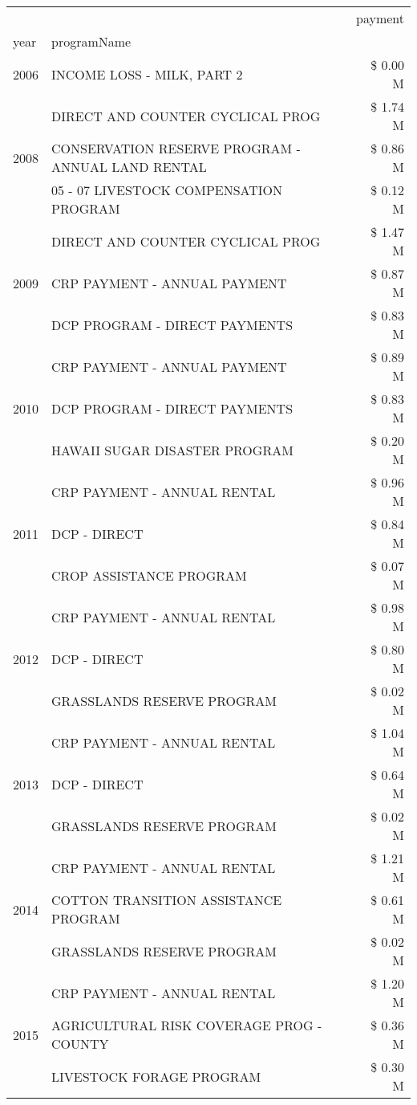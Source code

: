\begin{tabular}{llr}
\toprule
 &  & payment \\
year & programName &  \\
\midrule
2006 & INCOME LOSS - MILK, PART 2 & \$ 0.00 M \\
\cline{1-3}
\multirow[t]{3}{*}{2008} & DIRECT AND COUNTER CYCLICAL PROG & \$ 1.74 M \\
 & CONSERVATION RESERVE PROGRAM - ANNUAL LAND RENTAL & \$ 0.86 M \\
 & 05 - 07 LIVESTOCK COMPENSATION PROGRAM & \$ 0.12 M \\
\cline{1-3}
\multirow[t]{3}{*}{2009} & DIRECT AND COUNTER CYCLICAL PROG & \$ 1.47 M \\
 & CRP PAYMENT - ANNUAL PAYMENT & \$ 0.87 M \\
 & DCP PROGRAM - DIRECT PAYMENTS & \$ 0.83 M \\
\cline{1-3}
\multirow[t]{3}{*}{2010} & CRP PAYMENT - ANNUAL PAYMENT & \$ 0.89 M \\
 & DCP PROGRAM - DIRECT PAYMENTS & \$ 0.83 M \\
 & HAWAII SUGAR DISASTER PROGRAM & \$ 0.20 M \\
\cline{1-3}
\multirow[t]{3}{*}{2011} & CRP PAYMENT - ANNUAL RENTAL & \$ 0.96 M \\
 & DCP - DIRECT & \$ 0.84 M \\
 & CROP ASSISTANCE PROGRAM & \$ 0.07 M \\
\cline{1-3}
\multirow[t]{3}{*}{2012} & CRP PAYMENT - ANNUAL RENTAL & \$ 0.98 M \\
 & DCP - DIRECT & \$ 0.80 M \\
 & GRASSLANDS RESERVE PROGRAM & \$ 0.02 M \\
\cline{1-3}
\multirow[t]{3}{*}{2013} & CRP PAYMENT - ANNUAL RENTAL & \$ 1.04 M \\
 & DCP - DIRECT & \$ 0.64 M \\
 & GRASSLANDS RESERVE PROGRAM & \$ 0.02 M \\
\cline{1-3}
\multirow[t]{3}{*}{2014} & CRP PAYMENT - ANNUAL RENTAL & \$ 1.21 M \\
 & COTTON TRANSITION ASSISTANCE PROGRAM & \$ 0.61 M \\
 & GRASSLANDS RESERVE PROGRAM & \$ 0.02 M \\
\cline{1-3}
\multirow[t]{3}{*}{2015} & CRP PAYMENT - ANNUAL RENTAL & \$ 1.20 M \\
 & AGRICULTURAL RISK COVERAGE PROG - COUNTY & \$ 0.36 M \\
 & LIVESTOCK FORAGE PROGRAM & \$ 0.30 M \\

\end{tabular}
